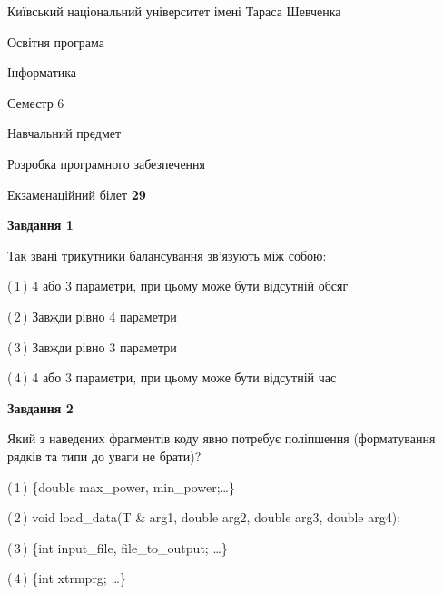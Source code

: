 \documentclass[10pt, ukrainian]{article}
\begin{document}
{{\begin {small}\par
{ \center  Київський національний університет імені Тараса Шевченка \par}
{\parbox {5 cm}{Освітня програма \hfill}{\parbox {7 cm}{Інформатика \hfill}}\parbox {6 cm}{\hfill Семестр 6}}\par
{\parbox {5 cm} {Навчальний предмет \hfill}\parbox {7 cm}{Розробка програмного забезпечення \hfill}\parbox {6cm}{\hfill}\par}\vspace{-7pt} \end{small}}{\center Екзаменаційний білет \No \textbf
{ 29 }\par}}
{
\begin {large}
{\begin {center}\textbf{Завдання 1}\end {center}}\par
Так звані трикутники балансування зв'язують між собою:\par
\vspace{2mm}



(\,1\,) 4 або 3 параметри, при цьому може бути відсутній обсяг %



(\,2\,) Завжди рівно 4 параметри%



(\,3\,) Завжди рівно 3 параметри%



(\,4\,) 4 або 3 параметри, при цьому може бути відсутній час%


{\begin {center}\textbf{Завдання 2}\end {center}}\par
Який з наведених фрагментів коду явно потребує поліпшення (форматування рядків та типи до уваги не брати)?\par
\vspace{2mm}



(\,1\,) \{double max\_power, min\_power;…\} %



(\,2\,) void load\_data(T \& arg1, double arg2, double arg3, double arg4); %



(\,3\,) \{int input\_file, file\_to\_output; …\}%



(\,4\,) \{int xtrmprg; …\}%



\end{large}}
\end{document}
